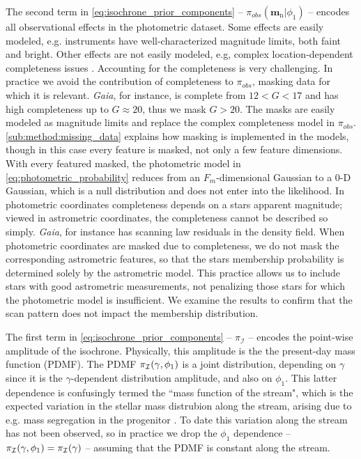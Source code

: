\documentclass[twocolumn]{aastex631}
\newcommand{\dataarchive}[1]{\textit{#1}}
\newcommand{\Gaia}{\dataarchive{Gaia}}
\newcommand{\mrm}[1]{\mathrm{#1}}
\newcommand{\mbs}[1]{\boldsymbol{#1}}
\newcommand{\mcal}[1]{\mathcal{#1}}
\newcommand{\prior}{\mcal{\pi}}
\newcommand{\nth}[1]{{#1}_{\mrm{n}}}  %
\begin{document}
            The second term in \autoref{eq:isochrone_prior_components} --
            $\prior_{obs}(\nth{\mbs{m}} | \phi_1)$ -- encodes all observational
            effects in the photometric dataset. Some effects are easily modeled,
            e.g. instruments have well-characterized magnitude limits, both
            faint and bright. Other effects are not easily modeled, e.g, complex
            location-dependent completeness issues \citep{GaiaCompleteness}.
            Accounting for the completeness is very challenging. In practice we
            avoid the contribution of completeness to $\prior_{obs}$, masking
            data for which it is relevant. \Gaia, for instance, is complete from
            $12 < G < 17$ and has high completeness up to $G \approx 20$, thus
            we mask $G > 20$.  The masks are easily modeled as magnitude limits
            and replace the complex completeness model in $\prior_{obs}$.
            \autoref{sub:method:missing_data} explains how masking is
            implemented in the models, though in this case every feature is
            masked, not only a few feature dimensions. With every featured
            masked, the photometric model in
            \autoref{eq:photometric_probability} reduces from an
            $F_m$-dimensional Gaussian to a 0-D Gaussian, which is a null
            distribution and does not enter into the likelihood.  In photometric
            coordinates completeness depends on a stars apparent magnitude;
            viewed in astrometric coordinates, the completeness cannot be
            described so simply. \Gaia, for instance has scanning law residuals
            in the density field. When photometric coordinates are masked due to
            completeness, we do not mask the corresponding  astrometric
            features, so that the stars membership probability is determined
            solely by the astrometric model. This practice allows us to include
            stars with good astrometric measurements, not penalizing those stars
            for which the photometric model is insufficient.  We examine the
            results to confirm that the scan pattern does not impact the
            membership distribution.

            The first term in \autoref{eq:isochrone_prior_components} --
            $\prior_{\mcal{I}}$ -- encodes the point-wise amplitude of the
            isochrone.  Physically, this amplitude is the the present-day mass
            function (PDMF). The PDMF $\prior_{\cal{I}}(\gamma, \phi_1)$ is a
            joint distribution, depending on $\gamma$ since it is the
            $\gamma$-dependent distribution amplitude, and also on $\phi_1$.
            This latter dependence is confusingly termed the ``mass function of
            the stream", which is the expected variation in the stellar mass
            distrubion along the stream, arising due to e.g. mass segregation in
            the progenitor \citep{WebbBovy2022}. To date this variation along
            the stream has not been observed, so in practice we drop the
            $\phi_1$ dependence -- $\prior_{\cal{I}}(\gamma, \phi_1) =
            \prior_{\cal{I}}(\gamma)$ -- assuming that the PDMF is constant
            along the stream.
\end{document}
